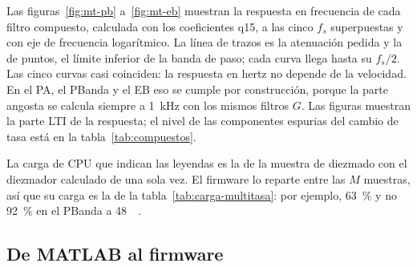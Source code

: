 \documentclass[11pt,a4paper]{article}
\begin{document}
Las figuras~\ref{fig:mt-pb} a~\ref{fig:mt-eb} muestran la respuesta en
frecuencia de cada filtro compuesto, calculada con los coeficientes q15, a
las cinco $f_s$ superpuestas y con eje de frecuencia logarítmico. La línea de
trazos es la atenuación pedida y la de puntos, el límite inferior de la
banda de paso; cada curva llega hasta su $f_s/2$. Las cinco curvas casi
coinciden: la respuesta en hertz no depende de la velocidad. En el PA, el
PBanda y el EB eso se cumple por construcción, porque la parte angosta se
calcula siempre a \qty{1}{\kilo\hertz} con los mismos filtros $G$. Las
figuras muestran la parte LTI de la respuesta; el nivel de las componentes
espurias del cambio de tasa está en la tabla~\ref{tab:compuestos}.

La carga de CPU que indican las leyendas es la de la muestra de diezmado con
el diezmador calculado de una sola vez. El firmware lo reparte entre las $M$
muestras, así que su carga es la de la tabla~\ref{tab:carga-multitasa}: por
ejemplo, \qty{63}{\percent} y no \qty{92}{\percent} en el PBanda a
\qty{48}{\kilo\sps}.





\subsection{De MATLAB al firmware}\label{sec:matlab-firmware}
\end{document}
